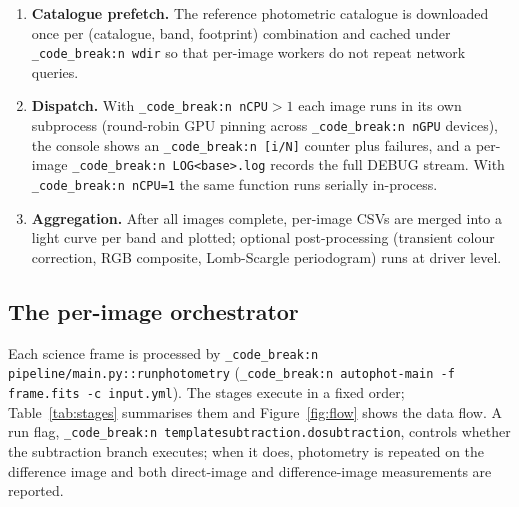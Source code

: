 \documentclass[11pt,a4paper]{article}
\renewcommand{\_}{\autophotunderscore\allowbreak}
\DeclareRobustCommand{\code}[1]{\texttt{\autophot_code_break:n {#1}}}
\begin{document}
\begin{enumerate}[leftmargin=2em,itemsep=1pt]
(Pan-STARRS1, Legacy Survey, or SkyMapper cutouts sized to the science
footprint).
\item \textbf{Catalogue prefetch.} The reference photometric catalogue is
downloaded once per (catalogue, band, footprint) combination and cached
under \code{wdir} so that per-image workers do not repeat network queries.
\item \textbf{Dispatch.} With \code{nCPU}$>1$ each image runs in its own
subprocess (round-robin GPU pinning across \code{nGPU} devices), the
console shows an \code{[i/N]} counter plus failures, and a per-image
\code{LOG\_<base>.log} records the full DEBUG stream. With \code{nCPU=1}
the same function runs serially in-process.
\item \textbf{Aggregation.} After all images complete, per-image CSVs are
merged into a light curve per band and plotted; optional post-processing
(transient colour correction, RGB composite, Lomb-Scargle periodogram)
runs at driver level.
\end{enumerate}

\subsection{The per-image orchestrator}
\label{sec:perimage}

Each science frame is processed by
\code{pipeline/main.py::run\_photometry} (\code{autophot-main -f frame.fits
-c input.yml}). The stages execute in a fixed order;
Table~\ref{tab:stages} summarises them and Figure~\ref{fig:flow} shows the
data flow. A run flag, \code{template\_subtraction.do\_subtraction},
controls whether the subtraction branch executes; when it does, photometry
is repeated on the difference image and both direct-image and
difference-image measurements are reported.
\end{document}
